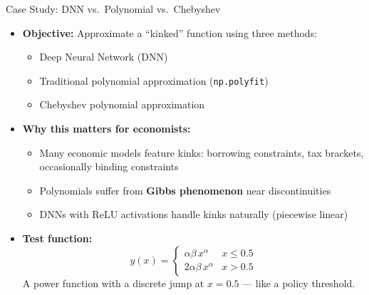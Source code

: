 \documentclass[10pt,english,aspectratio=169]{beamer}
\begin{document}
\begin{frame}{Case Study: DNN vs.\ Polynomial vs.\ Chebyshev}
\begin{itemize}
\item \textbf{Objective:} Approximate a ``kinked'' function using three methods:
\begin{itemize}
    \item Deep Neural Network (DNN)
    \item Traditional polynomial approximation (\texttt{np.polyfit})
    \item Chebyshev polynomial approximation
\end{itemize}

\medskip
\item \textbf{Why this matters for economists:}
\begin{itemize}
    \item Many economic models feature kinks: borrowing constraints, tax brackets, occasionally binding constraints
    \item Polynomials suffer from \textbf{Gibbs phenomenon} near discontinuities
    \item DNNs with ReLU activations handle kinks naturally (piecewise linear)
\end{itemize}

\medskip
\item \textbf{Test function:}
\[
y(x) = \begin{cases} \alpha\beta\, x^\alpha & x \leq 0.5 \\ 2\alpha\beta\, x^\alpha & x > 0.5 \end{cases}
\]
A power function with a discrete jump at $x=0.5$ --- like a policy threshold.
\end{itemize}
\end{frame}
\end{document}
